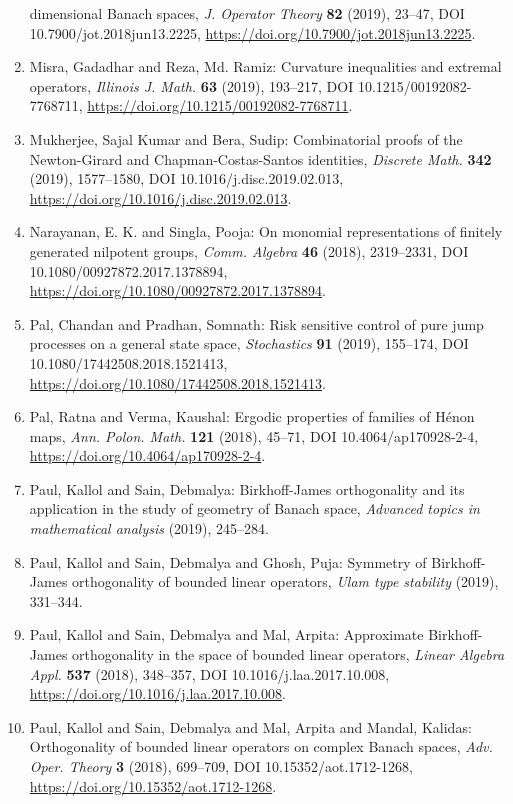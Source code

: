 \begin{enumerate}
dimensional {B}anach spaces, \emph{J. Operator Theory} {\bf 82} (2019), 23--47, DOI 10.7900/jot.2018jun13.2225, \url{https://doi.org/10.7900/jot.2018jun13.2225}.
\item Misra, Gadadhar and Reza, Md. Ramiz: Curvature inequalities and extremal operators, \emph{Illinois J. Math.} {\bf 63} (2019), 193--217, DOI 10.1215/00192082-7768711, \url{https://doi.org/10.1215/00192082-7768711}.
\item Mukherjee, Sajal Kumar and Bera, Sudip: Combinatorial proofs of the {N}ewton-{G}irard and
{C}hapman-{C}ostas-{S}antos identities, \emph{Discrete Math.} {\bf 342} (2019), 1577--1580, DOI 10.1016/j.disc.2019.02.013, \url{https://doi.org/10.1016/j.disc.2019.02.013}.
\item Narayanan, E. K. and Singla, Pooja: On monomial representations of finitely generated nilpotent
groups, \emph{Comm. Algebra} {\bf 46} (2018), 2319--2331, DOI 10.1080/00927872.2017.1378894, \url{https://doi.org/10.1080/00927872.2017.1378894}.
\item Pal, Chandan and Pradhan, Somnath: Risk sensitive control of pure jump processes on a general
state space, \emph{Stochastics} {\bf 91} (2019), 155--174, DOI 10.1080/17442508.2018.1521413, \url{https://doi.org/10.1080/17442508.2018.1521413}.
\item Pal, Ratna and Verma, Kaushal: Ergodic properties of families of {H}\'{e}non maps, \emph{Ann. Polon. Math.} {\bf 121} (2018), 45--71, DOI 10.4064/ap170928-2-4, \url{https://doi.org/10.4064/ap170928-2-4}.
\item Paul, Kallol and Sain, Debmalya: Birkhoff-{J}ames orthogonality and its application in the
study of geometry of {B}anach space, \emph{Advanced topics in mathematical analysis} {\bf } (2019), 245--284.
\item Paul, Kallol and Sain, Debmalya and Ghosh, Puja: Symmetry of {B}irkhoff-{J}ames orthogonality of bounded linear
operators, \emph{Ulam type stability} {\bf } (2019), 331--344.
\item Paul, Kallol and Sain, Debmalya and Mal, Arpita: Approximate {B}irkhoff-{J}ames orthogonality in the space of
bounded linear operators, \emph{Linear Algebra Appl.} {\bf 537} (2018), 348--357, DOI 10.1016/j.laa.2017.10.008, \url{https://doi.org/10.1016/j.laa.2017.10.008}.
\item Paul, Kallol and Sain, Debmalya and Mal, Arpita and Mandal,
Kalidas: Orthogonality of bounded linear operators on complex {B}anach
spaces, \emph{Adv. Oper. Theory} {\bf 3} (2018), 699--709, DOI 10.15352/aot.1712-1268, \url{https://doi.org/10.15352/aot.1712-1268}.

\end{enumerate}
